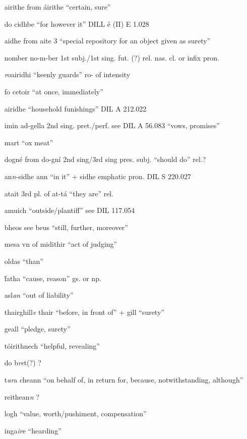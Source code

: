 \documentclass[11pt]{article}
\begin{document}
\begin{enumerate}
  \item[airithe] from \'{a}irithe \enquote{certain, sure}
  \item[do cidhbe] \enquote{for however it} DILL \'{e} (II) E 1.028
  \item[aidhe] from aite 3 \enquote{special repository for an object given as surety}
  \item[nomber] no-m-ber 1st subj./1st sing. fut. (?) rel. nas. cl. or infix pron.
  \item[\emph{r}oairidhi] \enquote{keenly guards} ro- of intensity
  \item[fo cetoir] \enquote{at once, immediately} 
  \item[airidhe] \enquote{household funishings} DIL A 212.022
  \item[imin] ad-gella 2nd sing. pret./perf. see DIL A 56.083 \enquote{vows, promises}
  \item[mart] \enquote{ox meat}
  \item[dogn\'{e}] from do-gn\'{i} 2nd sing/3rd sing pres. subj. \enquote{should do} rel.?
  \item[an\emph{n}-sidhe] ann \enquote{in it} + sidhe emphatic pron. DIL S 220.027
  \item[atait] 3rd pl. of at-t\'{a} \enquote{they are} rel.
  \item[amuich] \enquote{outside/plantiff} see DIL 117.054
  \item[bheos] see beus \enquote{still, further, moreover} 
  \item[mesa] vn of midithir \enquote{act of judging}
  \item[oldas] \enquote{than}
  \item[\.{f}atha] \enquote{cause, reason} gs. or np.
  \item[asl\emph{an}] \enquote{out of liability}
  \item[thairghill\emph{e}]  thair \enquote{before, in front of} + gill \enquote{surety} 
  \item[geall] \enquote{pledge, surety}
  \item[t\'{o}irithnech] \enquote{helpful, revealing}
  \item[do b\emph{re}t(?)] ?
  \item[t\emph{ar}a cheann] \enquote{on behalf of, in return for, because, notwithstanding, although}
  \item[reithean\emph{n}] ?
  \item[logh] \enquote{value, worth/pushiment, compensation}
  \item[inga\emph{ir}e] \enquote{hearding}

\end{enumerate}
\end{document}
